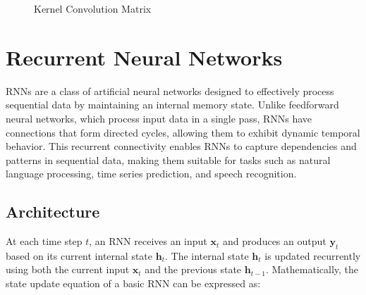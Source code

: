 \documentclass[a4paper]{report}
\newcommand\numRowsK{3}
\newcommand\numColsK{3}
\newcommand{\K}[2]{%
    \edef\Kcol##1##2##3{###2}%
    \edef\Krow##1##2##3{\noexpand\Kcol###1}%
    \Krow
        {1 0 1}
        {0 1 0}
        {1 0 1}%
}
\begin{document}
{\begin{figure}[H]
\begin{center}
%
\caption{Kernel Convolution Matrix}
\end{center}
\end{figure}
\newpage
\section{Recurrent Neural Networks}
RNNs are a class of artificial neural networks designed to effectively process sequential data by maintaining an internal memory state. Unlike feedforward neural networks, which process input data in a single pass, RNNs have connections that form directed cycles, allowing them to exhibit dynamic temporal behavior. This recurrent connectivity enables RNNs to capture dependencies and patterns in sequential data, making them suitable for tasks such as natural language processing, time series prediction, and speech recognition.

\subsection{Architecture}

At each time step \( t \), an RNN receives an input \( \mathbf{x}_t \) and produces an output \( \mathbf{y}_t \) based on its current internal state \( \mathbf{h}_t \). The internal state \( \mathbf{h}_t \) is updated recurrently using both the current input \( \mathbf{x}_t \) and the previous state \( \mathbf{h}_{t-1} \). Mathematically, the state update equation of a basic RNN can be expressed as:

}
\end{document}
